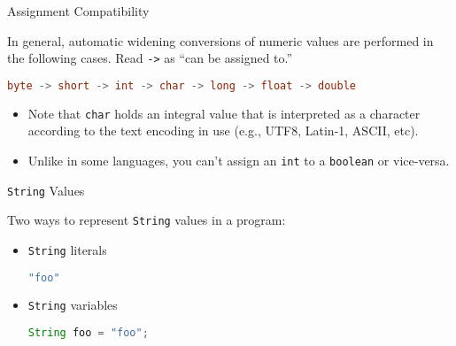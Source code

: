 \documentclass{beamer}
\begin{document}
\begin{frame}[fragile]{Assignment Compatibility}


In general, automatic widening conversions of numeric values are performed in the following cases.  Read {\tt ->} as ``can be assigned to.''

\begin{lstlisting}[language=Java]
byte -> short -> int -> char -> long -> float -> double
\end{lstlisting}

\begin{itemize}
\item Note that {\tt char} holds an integral value that is interpreted as a character according to the text encoding in use (e.g., UTF8, Latin-1, ASCII, etc).
\item Unlike in some languages, you can't assign an {\tt int} to a {\tt boolean} or vice-versa.
\end{itemize}

\end{frame}

\begin{frame}[fragile]{{\tt String} Values}


Two ways to represent {\tt String} values in a program:
\begin{itemize}

\item {\tt String} literals
\begin{lstlisting}[language=Java]
"foo"
\end{lstlisting}

\item {\tt String} variables

\begin{lstlisting}[language=Java]
String foo = "foo";
\end{lstlisting}

 
\end{itemize}
\end{frame}
\end{document}
